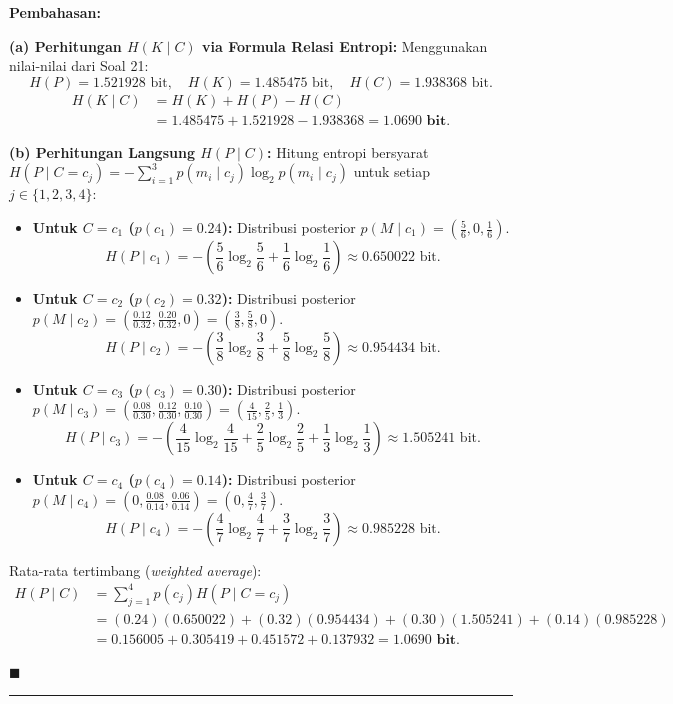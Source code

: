\documentclass[11pt,a4paper]{article}
\newenvironment{solusi}{\noindent\textbf{\textsf{Pembahasan:}}\par\vspace{0.2em}}{\hfill$\blacksquare$\vspace{1em}\par\hrule\vspace{1em}}
\begin{document}
\begin{solusi}
\textbf{(a) Perhitungan $H(K \mid C)$ via Formula Relasi Entropi:}
Menggunakan nilai-nilai dari Soal 21:
\[
H(P) = 1.521928 \text{ bit}, \quad H(K) = 1.485475 \text{ bit}, \quad H(C) = 1.938368 \text{ bit}.
\]
\begin{align*}
H(K \mid C) &= H(K) + H(P) - H(C) \\
&= 1.485475 + 1.521928 - 1.938368 = \mathbf{1.0690 \text{ bit}}.
\end{align*}

\vspace{0.2cm}
\textbf{(b) Perhitungan Langsung $H(P \mid C)$:}
Hitung entropi bersyarat $H(P \mid C = c_j) = -\sum_{i=1}^3 p(m_i \mid c_j) \log_2 p(m_i \mid c_j)$ untuk setiap $j \in \{1, 2, 3, 4\}$:
\begin{itemize}[leftmargin=*]
    \item \textbf{Untuk $C = c_1$ ($p(c_1) = 0.24$):} Distribusi posterior $p(M \mid c_1) = (\frac{5}{6}, 0, \frac{1}{6})$.
    \[
    H(P \mid c_1) = -\left(\frac{5}{6} \log_2 \frac{5}{6} + \frac{1}{6} \log_2 \frac{1}{6}\right) \approx 0.650022 \text{ bit}.
    \]
    \item \textbf{Untuk $C = c_2$ ($p(c_2) = 0.32$):} Distribusi posterior $p(M \mid c_2) = (\frac{0.12}{0.32}, \frac{0.20}{0.32}, 0) = (\frac{3}{8}, \frac{5}{8}, 0)$.
    \[
    H(P \mid c_2) = -\left(\frac{3}{8} \log_2 \frac{3}{8} + \frac{5}{8} \log_2 \frac{5}{8}\right) \approx 0.954434 \text{ bit}.
    \]
    \item \textbf{Untuk $C = c_3$ ($p(c_3) = 0.30$):} Distribusi posterior $p(M \mid c_3) = (\frac{0.08}{0.30}, \frac{0.12}{0.30}, \frac{0.10}{0.30}) = (\frac{4}{15}, \frac{2}{5}, \frac{1}{3})$.
    \[
    H(P \mid c_3) = -\left(\frac{4}{15} \log_2 \frac{4}{15} + \frac{2}{5} \log_2 \frac{2}{5} + \frac{1}{3} \log_2 \frac{1}{3}\right) \approx 1.505241 \text{ bit}.
    \]
    \item \textbf{Untuk $C = c_4$ ($p(c_4) = 0.14$):} Distribusi posterior $p(M \mid c_4) = (0, \frac{0.08}{0.14}, \frac{0.06}{0.14}) = (0, \frac{4}{7}, \frac{3}{7})$.
    \[
    H(P \mid c_4) = -\left(\frac{4}{7} \log_2 \frac{4}{7} + \frac{3}{7} \log_2 \frac{3}{7}\right) \approx 0.985228 \text{ bit}.
    \]
\end{itemize}
Rata-rata tertimbang (\textit{weighted average}):
\begin{align*}
H(P \mid C) &= \sum_{j=1}^4 p(c_j) H(P \mid C = c_j) \\
&= (0.24)(0.650022) + (0.32)(0.954434) + (0.30)(1.505241) + (0.14)(0.985228) \\
&= 0.156005 + 0.305419 + 0.451572 + 0.137932 = \mathbf{1.0690 \text{ bit}}.
\end{align*}


\end{solusi}
\end{document}
